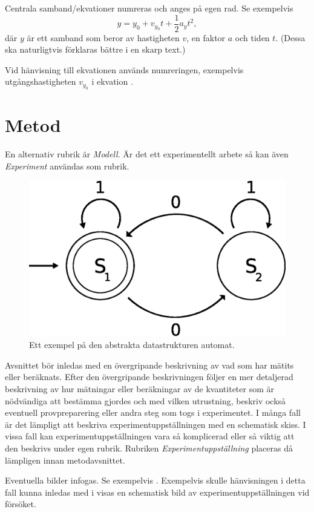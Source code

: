 \documentclass[a4paper,nologo]{miunart} %
\begin{document}
Centrala samband/ekvationer numreras och anges på egen rad.
Se exempelvis
\begin{equation}
	\label{eq:long-equation}
	y = y_0 + v_{y_0}t + \frac{1}{2}a_yt^2,
\end{equation}
där \(y\) är ett samband som beror av hastigheten \(v\), en faktor \(a\) och 
tiden \(t\).
(Dessa ska naturligtvis förklaras bättre i en skarp text.)

Vid hänvisning till ekvationen används numreringen, exempelvis 
utgångshastigheten \(v_{y_0}\) i ekvation .


\section{Metod}
\label{sec:method}
\noindent
En alternativ rubrik är \emph{Modell}.
Är det ett experimentellt arbete så kan även \emph{Experiment} användas som 
rubrik.

\begin{figure}
	\centering
	\includegraphics[width=0.7\linewidth]{automata.eps}
	\caption{Ett exempel på den abstrakta datastrukturen automat.}
	\label{fig:automata}
\end{figure}

Avsnittet bör inledas med en övergripande beskrivning av vad som har mätits 
eller beräknats.
Efter den övergripande beskrivningen följer en mer detaljerad beskrivning av 
hur mätningar eller beräkningar av de kvantiteter som är nödvändiga att 
bestämma gjordes och med vilken utrustning, beskriv också eventuell 
provpreparering eller andra steg som togs i experimentet.
I många fall är det lämpligt att beskriva experimentuppställningen med en 
schematisk skiss.
I vissa fall kan experimentuppställningen vara så komplicerad eller så viktig 
att den beskrivs under egen rubrik.
Rubriken \emph{Experimentuppställning} placeras då lämpligen innan 
metodavsnittet.

Eventuella bilder infogas.
Se exempelvis .
Exempelvis skulle hänvisningen i detta fall kunna inledas med 
i  visas en schematisk bild av experimentuppställningen 
vid försöket.
\end{document}

